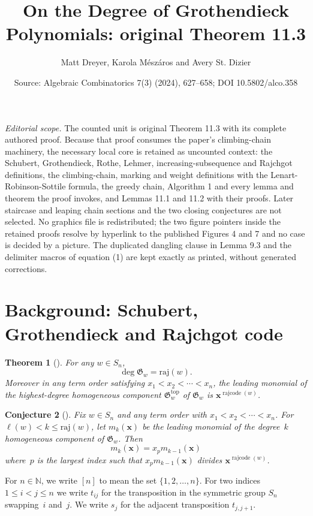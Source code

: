\documentclass[10pt,a4paper]{amsart}
\title[Leading monomials above minimal degree]{On the Degree of Grothendieck Polynomials: original Theorem 11.3}
\author{Matt Dreyer, Karola M\'esz\'aros and Avery St. Dizier}
\date{Source: Algebraic Combinatorics 7(3) (2024), 627--658; DOI 10.5802/alco.358}
\newcommand{\absrajcode}[1]{\mathrm{raj}(#1)}
\DeclareMathOperator{\rr}{\mathrm{rajcode}}
\newtheorem{theorem}{Theorem}[section]
\newtheorem{conjecture}[theorem]{Conjecture}
\begin{document}
\maketitle
\noindent\textit{Editorial scope.} The counted unit is original Theorem 11.3 with its complete authored proof. Because that proof consumes the paper's climbing-chain machinery, the necessary local core is retained as uncounted context: the Schubert, Grothendieck, Rothe, Lehmer, increasing-subsequence and Rajchgot definitions, the climbing-chain, marking and weight definitions with the Lenart-Robinson-Sottile formula, the greedy chain, Algorithm 1 and every lemma and theorem the proof invokes, and Lemmas 11.1 and 11.2 with their proofs. Later staircase and leaping chain sections and the two closing conjectures are not selected. No graphics file is redistributed; the two figure pointers inside the retained proofs resolve by hyperlink to the published Figures 4 and 7 and no case is decided by a picture. The duplicated dangling clause in Lemma 9.3 and the delimiter macros of equation (1) are kept exactly as printed, without generated corrections.
\section{Background: Schubert, Grothendieck and Rajchgot code}
\setcounter{section}{1}\setcounter{theorem}{0}
\begin{theorem}[{\cite[Theorem 1.1]{PSW}}]
	\label{thm:pswleadingterm}
	For any $w\in S_n$,
	\[\deg \mathfrak{G}_w=\absrajcode{w}.\]
	Moreover in any term order satisfying $x_1<x_2<\cdots<x_n$, the leading monomial of the highest-degree homogeneous component $\mathfrak{G}_w^{\mathrm{top}}$ of $\mathfrak{G}_w$ is $\bm{x}^{\rr(w)}$.
\end{theorem}

\setcounter{section}{1}\setcounter{theorem}{1}
\begin{conjecture}[{\cite[Conjecture 4.1]{elena1}}]
	\label{conj:elena}
	Fix $w\in S_n$ and any term order with $x_1<x_2<\cdots<x_n$. For $\ell(w)< k\leq \absrajcode{w}$, let $m_k(\bm{x})$ be the leading monomial of the degree~$k$ homogeneous component of $\mathfrak{G}_w$. Then
	\[m_k(\bm{x}) = x_pm_{k-1}(\bm{x}) \]
	where~$p$ is the largest index such that $x_p m_{k-1}(\bm{x})$ divides $\bm{x}^{\rr(w)}$.
\end{conjecture}

For $n\in \mathbb{N}$, we write $[n]$ to mean the set $\{1,2,\ldots,n \}$. For two indices $1\leq i<j\leq n$ we write $t_{ij}$ for the transposition in the symmetric group $S_n$ swapping~$i$ and~$j$. We write $s_j$ for the adjacent transposition $t_{j,j+1}$.
\end{document}
